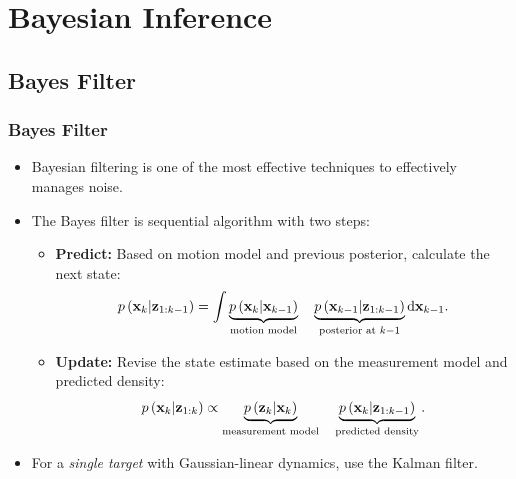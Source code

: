 \section{Bayesian Inference}

\subsection*{Bayes Filter}\begin{frame}\frametitle{Bayes Filter}
    \begin{itemize}
        \item Bayesian filtering is one of the most effective techniques to effectively manages noise.
        \pause
        \item The Bayes filter is sequential algorithm with two steps:
        \begin{itemize}
            \item \textbf{Predict:} Based on motion model and previous posterior, calculate the next state:
                \begin{equation*}
                    p\left(\vecat{x}{k} | \vecat{z}{1: k-1}\right) = \int
                        \underbrace{p\left( \vecat{x}{k} | \vecat{x}{k-1} \right)}_{\text{motion model}}
                        \quad
                        \underbrace{p\left( \vecat{x}{k-1} | \vecat{z}{1: k-1} \right)}_{\text{posterior at } k-1}
                        \mathrm{d} \vecat{x}{k-1}.
                \end{equation*}
            \pause
            \item \textbf{Update:} Revise the state estimate based on the measurement model and predicted density:
                \begin{equation*}
                    p\left(\vecat{x}{k} | \vecat{z}{1: k}\right) \propto
                    \underbrace{p\left(\vecat{z}{k} | \vecat{x}{k}\right)}_{\text{measurement model}}
                    \quad
                    \underbrace{p\left(\vecat{x}{k} | \vecat{z}{1: k-1}\right)}_{\text{predicted density}}.
                \end{equation*}
        \end{itemize}
        \pause
        \item For a \textit{single target} with Gaussian-linear dynamics, use the Kalman filter.
    \end{itemize}
\end{frame}


